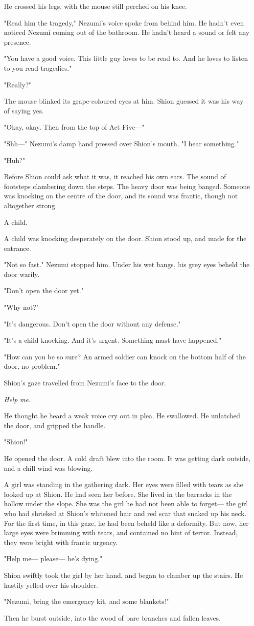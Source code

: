 He crossed his legs, with the mouse still perched on his knee.

"Read him the tragedy," Nezumi's voice spoke from behind him. He hadn't
even noticed Nezumi coming out of the bathroom. He hadn't heard a sound
or felt any presence.

"You have a good voice. This little guy loves to be read to. And he
loves to listen to you read tragedies."

"Really?"

The mouse blinked its grape-coloured eyes at him. Shion guessed it was
his way of saying yes.

"Okay, okay. Then from the top of Act Five---"

"Shh---" Nezumi's damp hand pressed over Shion's mouth. "I hear
something."

"Huh?"

Before Shion could ask what it was, it reached his own ears. The sound
of footsteps clambering down the steps. The heavy door was being banged.
Someone was knocking on the centre of the door, and its sound was frantic, though not altogether strong.

A child.

A child was knocking desperately on the door. Shion stood up, and made
for the entrance.

"Not so fast." Nezumi stopped him. Under his wet bangs, his grey eyes
beheld the door warily.

"Don't open the door yet."

"Why not?"

"It's dangerous. Don't open the door without any defense."

"It's a child knocking. And it's urgent. Something must have happened."

"How can you be so sure? An armed soldier can knock on the bottom half
of the door, no problem."

Shion's gaze travelled from Nezumi's face to the door.

\emph{Help me.}

He thought he heard a weak voice cry out in plea. He swallowed. He
unlatched the door, and gripped the handle.

"Shion!"

He opened the door. A cold draft blew into the room. It was getting dark
outside, and a chill wind was blowing.

A girl was standing in the gathering dark. Her eyes were filled with
tears as she looked up at Shion. He had seen her before. She lived in
the barracks in the hollow under the slope. She was the girl he had not
been able to forget--- the girl who had shrieked at Shion's whitened hair
and red scar that snaked up his neck. For the first time, in this gaze,
he had been beheld like a deformity. But now, her large eyes were
brimming with tears, and contained no hint of terror. Instead, they were
bright with frantic urgency.

"Help me--- please--- he's dying."

Shion swiftly took the girl by her hand, and began to clamber up the
stairs. He hastily yelled over his shoulder.

"Nezumi, bring the emergency kit, and some blankets!"

Then he burst outside, into the wood of bare branches and fallen leaves.